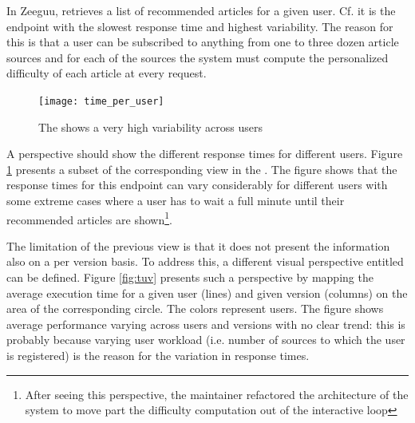 \documentclass{sig-alternate-05-2015}
\begin{document}


In Zeeguu, \epFeedItems retrieves a list of recommended articles for a given user. Cf.  it is the endpoint with the slowest response time and highest variability. The reason for this is that a user can be subscribed to anything from one to three dozen article sources and for each of the sources the system must compute the personalized difficulty of each article at every request. 



\begin{figure}[!ht]
	\centering
	\texttt{[image: time\_per\_user]}
	\caption{The \epFeedItems shows a very high variability across users}
	\label{fig:tpu}
\end{figure}

A  perspective should show the different response times for different users. Figure \ref{fig:tpu} presents a subset of the corresponding view in the \tool. The figure shows that the response times for this endpoint can vary considerably for different users with some extreme cases where a user has to wait a full minute until their recommended articles are shown\footnote{After seeing this perspective, the maintainer refactored the architecture of the system to move part the difficulty computation out of the interactive loop}.



The limitation of the previous view is that it does not present the information also on a per version basis. To address this, a different visual perspective entitled  can be defined. Figure \ref{fig:tuv} presents such a perspective by mapping the average execution time for a given user (lines) and given version (columns) on the area of the corresponding circle. The colors represent users. The figure shows average performance varying  across users and versions with no clear trend: this is probably because varying user workload (i.e. number of sources to which the user is registered) is the reason for the variation in response times.
\end{document}
